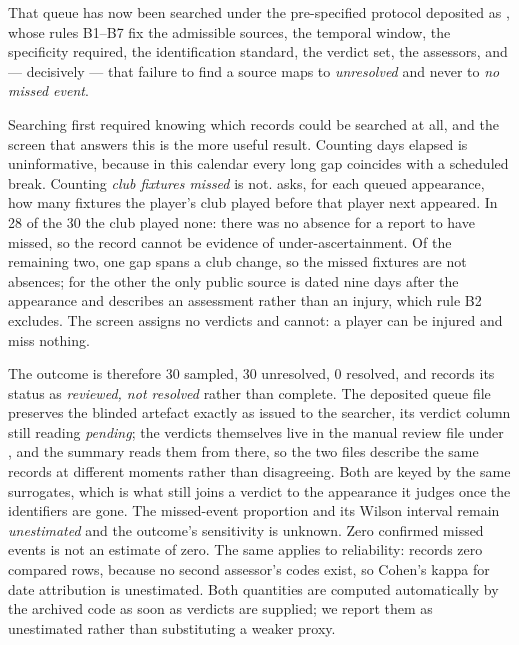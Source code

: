\documentclass[11pt]{article}
\begin{document}
That queue has now been searched under the pre-specified protocol deposited as , whose rules B1--B7 fix the admissible sources, the temporal window, the specificity required, the identification standard, the verdict set, the assessors, and --- decisively --- that failure to find a source maps to \emph{unresolved} and never to \emph{no missed event}.

Searching first required knowing which records could be searched at all, and the screen that answers this is the more useful result. Counting days elapsed is uninformative, because in this calendar every long gap coincides with a scheduled break. Counting \emph{club fixtures missed} is not.  asks, for each queued appearance, how many fixtures the player's club played before that player next appeared. In 28 of the 30 the club played none: there was no absence for a report to have missed, so the record cannot be evidence of under-ascertainment. Of the remaining two, one gap spans a club change, so the missed fixtures are not absences; for the other the only public source is dated nine days after the appearance and describes an assessment rather than an injury, which rule B2 excludes. The screen assigns no verdicts and cannot: a player can be injured and miss nothing.

The outcome is therefore 30 sampled, 30 unresolved, 0 resolved, and  records its status as \emph{reviewed, not resolved} rather than complete. The deposited queue file  preserves the blinded artefact exactly as issued to the searcher, its verdict column still reading \emph{pending}; the verdicts themselves live in the manual review file under , and the summary reads them from there, so the two files describe the same records at different moments rather than disagreeing. Both are keyed by the same surrogates, which is what still joins a verdict to the appearance it judges once the identifiers are gone. The missed-event proportion and its Wilson interval remain \emph{unestimated} and the outcome's sensitivity is unknown. Zero confirmed missed events is not an estimate of zero. The same applies to reliability:  records zero compared rows, because no second assessor's codes exist, so Cohen's kappa for date attribution is unestimated. Both quantities are computed automatically by the archived code as soon as verdicts are supplied; we report them as unestimated rather than substituting a weaker proxy.
\end{document}
